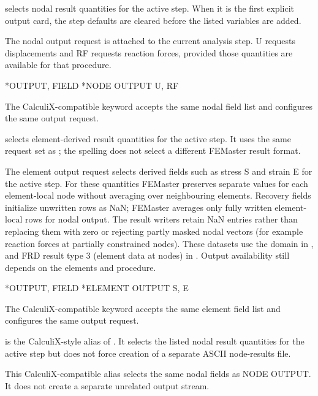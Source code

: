  selects nodal result quantities for the active step. When it is the first explicit output card, the step defaults are cleared before the listed variables are added.

The nodal output request is attached to the current analysis step. U requests displacements and RF requests reaction forces, provided those quantities are available for that procedure.

\exampleheading
\begin{inputdeck}
*OUTPUT, FIELD
*NODE OUTPUT
U, RF
\end{inputdeck}

The CalculiX-compatible  keyword accepts the
same nodal field list and configures the same output request.


 selects element-derived result quantities for the active step. It uses the same request set as ; the spelling does not select a different FEMaster result format.

The element output request selects derived fields such as stress S and strain E for the active step. For these quantities FEMaster preserves separate values for each element-local node without averaging over neighbouring elements. Recovery fields initialize unwritten rows as NaN; FEMaster averages only fully written element-local rows for nodal output. The result writers retain NaN entries rather than replacing them with zero or rejecting partly masked nodal vectors (for example reaction forces at partially constrained nodes). These datasets use the  domain in , and FRD result type 3 (element data at nodes) in . Output availability still depends on the elements and procedure.

\exampleheading
\begin{inputdeck}
*OUTPUT, FIELD
*ELEMENT OUTPUT
S, E
\end{inputdeck}

The CalculiX-compatible  keyword accepts the
same element field list and configures the same output request.


 is the CalculiX-style alias of . It selects the listed nodal result quantities for the active step but does not force creation of a separate ASCII node-results file.

This CalculiX-compatible alias selects the same nodal fields as NODE OUTPUT. It does not create a separate unrelated output stream.

